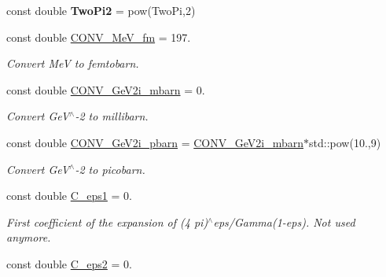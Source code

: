 \begin{DoxyCompactItemize}
\item 
\hypertarget{namespaceConstants_a2b59b5bfa81e4c4856decced98ea335c}{}const double {\bfseries Two\+Pi2} = pow(Two\+Pi,2)\label{namespaceConstants_a2b59b5bfa81e4c4856decced98ea335c}

\item 
\hypertarget{namespaceConstants_a87e93458211f4439996b0180c224dc9b}{}const double \hyperlink{namespaceConstants_a87e93458211f4439996b0180c224dc9b}{C\+O\+N\+V\+\_\+\+Me\+V\+\_\+fm} = 197.\label{namespaceConstants_a87e93458211f4439996b0180c224dc9b}

\begin{DoxyCompactList}\small\item\em Convert Me\+V to femtobarn. \end{DoxyCompactList}\item 
\hypertarget{namespaceConstants_a34a29f9238234188581f6a80cbe9f93d}{}const double \hyperlink{namespaceConstants_a34a29f9238234188581f6a80cbe9f93d}{C\+O\+N\+V\+\_\+\+Ge\+V2i\+\_\+mbarn} = 0.\label{namespaceConstants_a34a29f9238234188581f6a80cbe9f93d}

\begin{DoxyCompactList}\small\item\em Convert Ge\+V$^\wedge$-\/2 to millibarn. \end{DoxyCompactList}\item 
\hypertarget{namespaceConstants_afebddfeaa678e68660119f3535b159b0}{}const double \hyperlink{namespaceConstants_afebddfeaa678e68660119f3535b159b0}{C\+O\+N\+V\+\_\+\+Ge\+V2i\+\_\+pbarn} = \hyperlink{namespaceConstants_a34a29f9238234188581f6a80cbe9f93d}{C\+O\+N\+V\+\_\+\+Ge\+V2i\+\_\+mbarn}$\ast$std\+::pow(10.,9)\label{namespaceConstants_afebddfeaa678e68660119f3535b159b0}

\begin{DoxyCompactList}\small\item\em Convert Ge\+V$^\wedge$-\/2 to picobarn. \end{DoxyCompactList}\item 
\hypertarget{namespaceConstants_ad6cbf9275cfd499e91ea8a36413e8710}{}const double \hyperlink{namespaceConstants_ad6cbf9275cfd499e91ea8a36413e8710}{C\+\_\+eps1} = 0.\label{namespaceConstants_ad6cbf9275cfd499e91ea8a36413e8710}

\begin{DoxyCompactList}\small\item\em First coefficient of the expansion of (4 pi)$^\wedge$eps/\+Gamma(1-\/eps). Not used anymore. \end{DoxyCompactList}\item 
\hypertarget{namespaceConstants_a7b274ecbfd01a275f44238a5bc1bd12e}{}const double \hyperlink{namespaceConstants_a7b274ecbfd01a275f44238a5bc1bd12e}{C\+\_\+eps2} = 0.\label{namespaceConstants_a7b274ecbfd01a275f44238a5bc1bd12e}


\end{DoxyCompactItemize}
